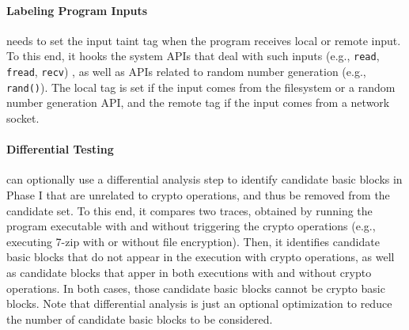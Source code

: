 \paragraph{Labeling Program Inputs} \sysname needs to set the input taint tag when the program receives  local or remote input. To this end, it hooks the system APIs that deal with such inputs (e.g., \texttt{read}, \texttt{fread}, \texttt{recv}) , as well as APIs related to random number generation (e.g.,  \texttt{rand()}).
The local tag is set if the input comes from the filesystem or a random number generation API, 
and the remote tag if the input comes from a network socket.

\paragraph{Differential Testing}
\sysname can optionally use a differential analysis step to identify candidate basic blocks in Phase I that are unrelated to crypto operations, and thus be removed from the candidate set. 
To this end, it compares two traces, obtained by running the program executable with and without triggering the crypto operations (e.g., executing \textsf{\small 7-zip} with or without file encryption). 
Then, it identifies candidate basic blocks that do not appear in the execution with crypto operations, as well as candidate blocks that apper in both executions with and without crypto operations. 
In both cases, those candidate basic blocks cannot be crypto basic blocks. 
Note that differential analysis is just an optional optimization to reduce the number of candidate basic blocks to be considered.


